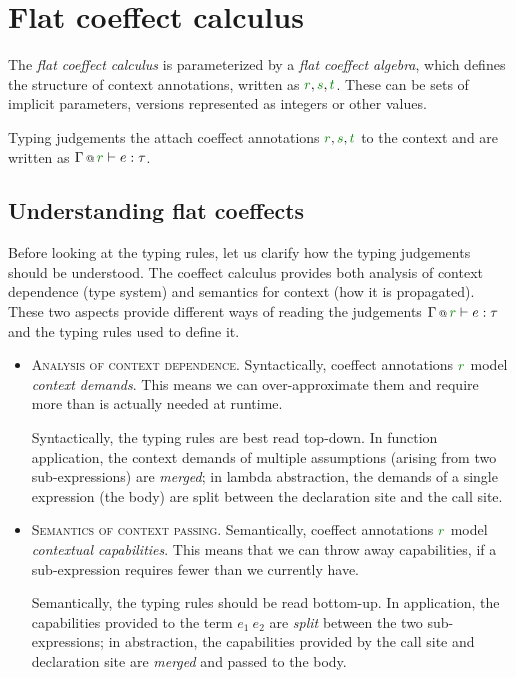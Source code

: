 \section{Flat coeffect calculus}
\label{sec:flat-calculus}

The \emph{flat coeffect calculus} is parameterized by a \emph{flat coeffect algebra}, which defines
the structure of context annotations, written as $\cclrd{r}, \cclrd{s}, \cclrd{t}$. These can be
sets of implicit parameters, versions represented as integers or other values.

Typing judgements the attach coeffect annotations $\cclrd{r}, \cclrd{s}, \cclrd{t}$ to the context
and are written as $\coctx{\Gamma}{\cclrd{r}}\vdash e:\tau$.


\subsection{Understanding flat coeffects}
\label{sec:flat-calculus-undestanding}

Before looking at the typing rules, let us clarify how the typing judgements
should be understood. The coeffect calculus provides both analysis of context dependence (type
system) and semantics for context (how it is propagated). These two aspects provide different
ways of reading the judgements $\coctx{\Gamma}{\cclrd{r}} \vdash e : \tau$ and the typing rules
used to define it.

\begin{itemize}
\item \textsc{Analysis of context dependence.}
Syntactically, coeffect annotations $\cclrd{r}$ model \emph{context demands}. This means
we can over-approximate them and require more than is actually needed at runtime.

Syntactically, the typing rules are best read top-down. In function application, the context
demands of multiple assumptions (arising from two sub-expressions) are \emph{merged}; in
lambda abstraction, the demands of a single expression (the body) are split between
the declaration site and the call site.

\item \textsc{Semantics of context passing.}
Semantically, coeffect annotations $\cclrd{r}$ mo\-del \emph{contextual capabilities}. This means
that we can throw away capabilities, if a sub-expression requires fewer than we
currently have.

Semantically, the typing rules should be read bottom-up. In application, the capabilities
provided to the term $e_1~e_2$ are \emph{split} between the two sub-expressions; in abstraction,
the capabilities provided by the call site and declaration site are \emph{merged} and passed
to the body.
\end{itemize}

